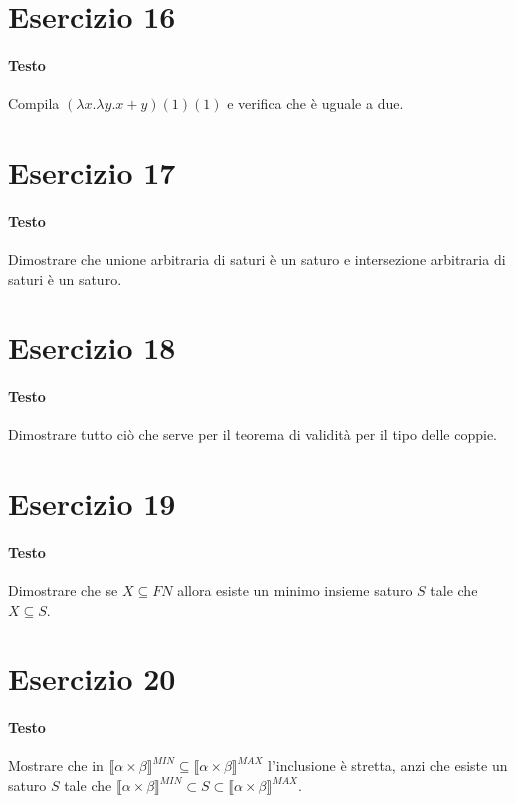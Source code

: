 \documentclass[a4paper,10pt]{article}
\begin{document}
\section*{Esercizio 16}
\paragraph{Testo}
Compila $(\lambda x.\lambda y. x+y)(1)(1)$ e verifica che è uguale a due.

\section*{Esercizio 17}
\paragraph{Testo}
Dimostrare che unione arbitraria di saturi è un saturo e intersezione arbitraria di saturi è un saturo.

\section*{Esercizio 18}
\paragraph{Testo}
Dimostrare tutto ciò che serve per il teorema di validità per il tipo delle coppie.

\section*{Esercizio 19}
\paragraph{Testo}
Dimostrare che se $X \subseteq F N$ allora esiste un minimo insieme saturo $S$ tale che $X \subseteq S$.

\section*{Esercizio 20}
\paragraph{Testo}
Mostrare che in $\llbracket \alpha \times \beta \rrbracket^{MIN} \subseteq \llbracket \alpha \times \beta \rrbracket^{MAX}$ l’inclusione è stretta, anzi che esiste un saturo $S$ tale che $\llbracket \alpha \times \beta \rrbracket^{MIN} \subset S \subset \llbracket \alpha \times \beta \rrbracket^{MAX}$.
\end{document}
